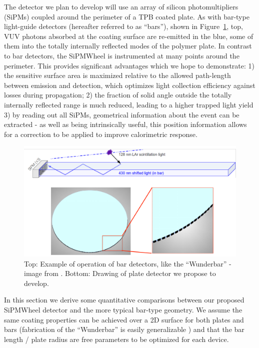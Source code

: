 The detector we plan to develop will use an array of silicon photomultipliers (SiPMs) coupled around the perimeter of a TPB coated plate.  As with bar-type light-guide detectors (hereafter referred to as ``bars''), shown in Figure~\ref{fig:DetectorSketch}, top, VUV photons absorbed at the coating surface are re-emitted in the blue, some of them into the totally internally reflected modes of the polymer plate.  In contrast to bar detectors, the SiPMWheel is instrumented at many points around the perimeter.  This provides significant advantages which we hope to demonstrate: 1) the sensitive surface area is maximized relative to the allowed path-length between emission and detection, which optimizes light collection efficiency against losses during propagation; 2) the fraction of solid angle outside the totally internally reflected range is much reduced, leading to a higher trapped light yield  3) by reading out all SiPMs, geometrical information about the  event can be extracted - as well as being intrinsically useful, this position information allows for a correction to be applied to improve calorimetric response.




\begin{figure}[t]
\begin{centering}
\includegraphics[width=0.95\columnwidth]{./images/SketchOfDetector.pdf}
\par\end{centering}

\caption{Top: Example of operation of bar detectors, like the ``Wunderbar'' - image from \cite{Whittington:2014aha}.  Bottom: Drawing of plate detector we propose to develop. \label{fig:DetectorSketch}}
\end{figure}

In this section we derive some quantitative comparisons between our proposed SiPMWheel detector and the more typical bar-type geometry.  We assume the same coating properties can be achieved over a 2D surface for both plates and bars (fabrication of the ``Wunderbar'' is easily generalizable \cite{Moss:2014ota}) and that the bar length / plate radius are free parameters to be optimized for each device. 

